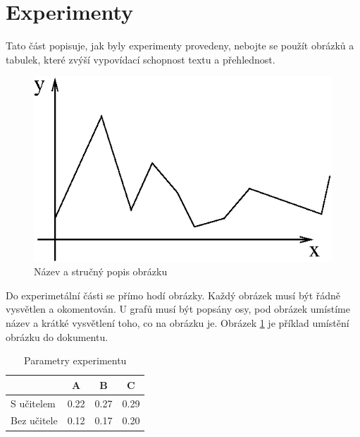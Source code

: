 \documentclass[journal]{IEEEtrancz}
\begin{document}

\section{Experimenty}
Tato část popisuje, jak byly experimenty provedeny, nebojte se použít obrázků a tabulek, které
zvýší vypovídací schopnost textu a přehlednost.

\begin{figure}[ht]
  \centering
    \includegraphics{figure}
      \caption{Název a stručný popis obrázku}
    \label{fig:exfig}
\end{figure}

Do experimetální části se přímo hodí obrázky. Každý obrázek musí být řádně vysvětlen
a okomentován. U grafů musí být popsány osy, pod obrázek umístíme název a 
krátké vysvětlení toho, co na obrázku je. Obrázek \ref{fig:exfig} je příklad
umístění obrázku do dokumentu.

\begin{table}
  \centering
  \caption{Parametry experimentu}
  \begin{tabular}{|l||c|c|c|}
  \hline
    & A & B & C \\
  \hline
  \hline
  S učitelem  & 0.22 & 0.27 & 0.29 \\
  \hline
  Bez učitele & 0.12 & 0.17 & 0.20 \\ 
  \hline
  \end{tabular}
  \label{tab:extab}
\end{table}
\end{document}
